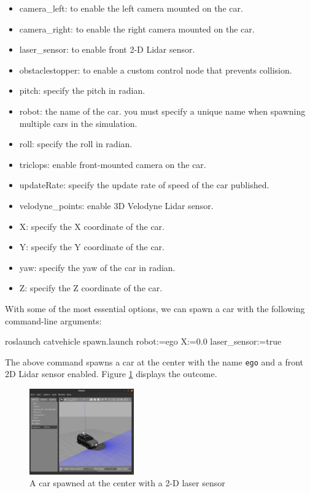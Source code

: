 \documentclass[
]{article}
\newenvironment{Shaded}{\begin{snugshade}}{\end{snugshade}}
\newcommand{\ExtensionTok}[1]{#1}
\newcommand{\NormalTok}[1]{#1}
\providecommand{\tightlist}{%
  \setlength{\itemsep}{0pt}\setlength{\parskip}{0pt}}
\begin{document}
\begin{itemize}
\tightlist
\item
  camera\_left: to enable the left camera mounted on the car.
\item
  camera\_right: to enable the right camera mounted on the car.
\item
  laser\_sensor: to enable front 2-D Lidar sensor.
\item
  obstaclestopper: to enable a custom control node that prevents
  collision.
\item
  pitch: specify the pitch in radian.
\item
  robot: the name of the car. you must specify a unique name when
  spawning multiple cars in the simulation.
\item
  roll: specify the roll in radian.
\item
  triclops: enable front-mounted camera on the car.
\item
  updateRate: specify the update rate of speed of the car published.
\item
  velodyne\_points: enable 3D Velodyne Lidar sensor.
\item
  X: specify the X coordinate of the car.
\item
  Y: specify the Y coordinate of the car.
\item
  yaw: specify the yaw of the car in radian.
\item
  Z: specify the Z coordinate of the car.
\end{itemize}

With some of the most essential options, we can spawn a car with the
following command-line arguments:

\begin{Shaded}
\begin{Highlighting}[]
\ExtensionTok{roslaunch}\NormalTok{ catvehicle spawn.launch robot:=ego X:=0.0 laser\_sensor:=true}
\end{Highlighting}
\end{Shaded}

The above command spawns a car at the center with the name \texttt{ego}
and a front 2D Lidar sensor enabled. Figure \ref{fig:Gazebo_003.png}
displays the outcome.

\begin{figure}[htbp]
\centering
\includegraphics[width=0.4\textwidth]{Gazebo_003.png}
\caption{A car spawned at the center with a 2-D laser sensor}
\label{fig:Gazebo_003.png}
\end{figure}
\end{document}
